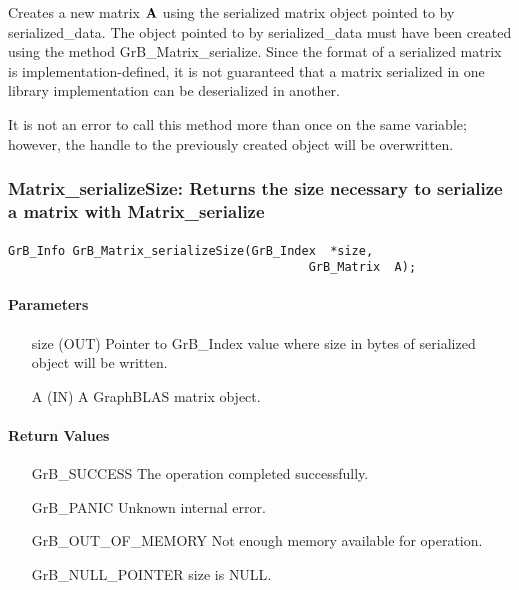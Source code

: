 Creates a new matrix ${\bf A}$ using the serialized matrix object pointed to
by {\sf serialized\_data}.  The object pointed to by {\sf serialized\_data}
must have been created using the method {\sf GrB\_Matrix\_serialize}.  Since
the format of a serialized matrix is implementation-defined, it is not guaranteed
that a matrix serialized in one library implementation can be deserialized in
another.

It is not an error to call this method more than once on the same variable;  
however, the handle to the previously created object will be overwritten. 


\subsubsection{{\sf Matrix\_serializeSize}: Returns the size necessary to serialize a matrix with {\sf Matrix\_serialize}}
\label{Sec:Matrix_serializeSize}

\paragraph{\syntax}

\begin{Verbatim}[samepage=true]
        GrB_Info GrB_Matrix_serializeSize(GrB_Index  *size,
                                          GrB_Matrix  A);
\end{Verbatim}

\paragraph{Parameters}

\begin{itemize}[leftmargin=1.1in]
    \item[{\sf size}] ({\sf OUT}) Pointer to {\sf GrB\_Index} value where size in bytes of serialized object will be written.
    \item[{\sf A}]      ({\sf IN}) A GraphBLAS matrix object.
\end{itemize}

\paragraph{Return Values}

\begin{itemize}[leftmargin=2.3in]
    \item[{\sf GrB\_SUCCESS}]         The operation completed successfully.

    \item[{\sf GrB\_PANIC}]           Unknown internal error.
    
    \item[{\sf GrB\_OUT\_OF\_MEMORY}] Not enough memory available for operation.
    
    \item[{\sf GrB\_NULL\_POINTER}]  {\sf size} is {\sf NULL}.
\end{itemize}


